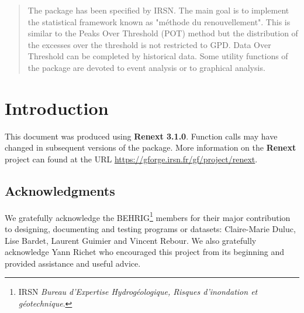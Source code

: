 \documentclass[a4paper]{report}
\newcommand\blankpage{%
    \null
    \thispagestyle{empty}%
    \addtocounter{page}{-1}%
    \newpage}
\newenvironment{Prov}
   {\medskip \par \noindent%
    \sf \color{blue} }%
  {\medskip \par}
\begin{document}
\begin{abstract}
  
  The \verb@Renext@ package has been specified by IRSN.  The main goal
  is to implement the statistical framework known as "m\'ethode du
  renouvellement".  This is similar to the Peaks Over Threshold (POT)
  method but the distribution of the excesses over the threshold is
  not restricted to GPD. Data Over Threshold can be completed by
  historical data.  Some utility functions of the package are devoted
  to event analysis or to graphical analysis.

\end{abstract}

\pagebreak

\setcounter{page}{1}

\chapter{Introduction}
\label{Chap-Intro}

\begin{Prov}
  This document was produced using  \textbf{Renext 3.1.0}. 
  Function calls may have changed in subsequent versions of the package.
  More information on the \textbf{Renext} project can found at the 
  URL \url{https://gforge.irsn.fr/gf/project/renext}.
\end{Prov}

\section*{Acknowledgments}
 
We gratefully acknowledge the BEHRIG\footnote{IRSN \textit{Bureau
    d'Expertise Hydrog\'eologique, Risques d'inondation et
    g\'eotechnique}.} members for their major contribution to
designing, documenting and testing programs or datasets: Claire-Marie
Duluc, Lise Bardet, Laurent Guimier and Vincent Rebour. We also
gratefully acknowledge Yann Richet who encouraged this project from
its beginning and provided assistance and useful advice.
\end{document}

